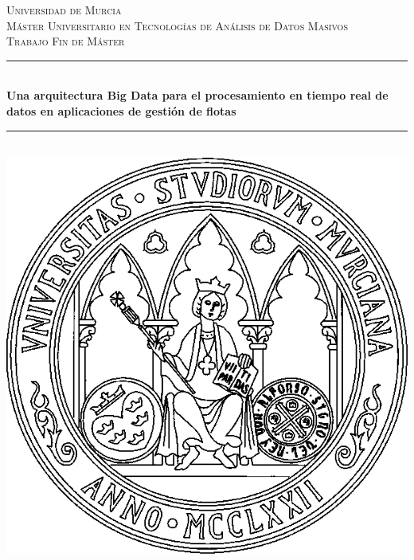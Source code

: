 \documentclass[12pt,twoside,openany]{article}     %
\begin{document}
	\begin{titlepage}
		
		\newcommand{\HRule}{\rule{\linewidth}{0.5mm}} %
		
		\center %
		
		
		\textsc{\LARGE Universidad de Murcia}\\[1.5cm] %
		\textsc{\Large Máster Universitario en Tecnologías de Análisis de Datos Masivos}\\[0.5cm] %
		\textsc{\large Trabajo Fin de Máster}\\[0.5cm] %
		
		
		\HRule \\[0.4cm]
		{ \huge \bfseries Una arquitectura Big Data para el procesamiento en tiempo real de datos en aplicaciones de gestión de flotas
			}\\[0.4cm] %
		\HRule \\[1cm]
		
		
		\includegraphics[scale = 0.3]{Imagenes/escudoum.png}\\[2cm] %
		

\end{titlepage}
\end{document}
